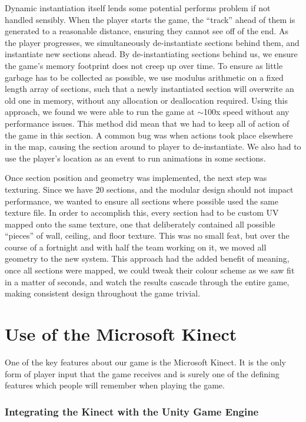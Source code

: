 \documentclass[a4paper,oneside]{memoir}
\begin{document}
			Dynamic instantiation itself lends some potential performs problem if not handled sensibly. 
			When the player starts the game, the ``track'' ahead of them is generated to a reasonable distance, ensuring they cannot see off of the end.
			As the player progresses, we simultaneously de-instantiate sections behind them, and instantiate new sections ahead. By de-instantiating sections behind us, we ensure the game's memory footprint does not creep up over time. 
			To ensure as little garbage has to be collected as possible, we use modulus arithmetic on a fixed length array of sections, such that a newly instantiated section will overwrite an old one in memory, without any allocation or deallocation required.
			Using this approach, we found we were able to run the game at $\sim$100x speed without any performance issues.
			This method did mean that we had to keep all of action of the game in this section. A common bug was when actions took place elsewhere in the map, causing the section around to player to de-instantiate. 
			We also had to use the player's location as an event to run animations in some sections. 

			Once section position and geometry was implemented, the next step was texturing.
			Since we have 20 sections, and the modular design should not impact performance, we wanted to ensure all sections where possible used the same texture file.
			In order to accomplish this, every section had to be custom UV mapped onto the same texture, one that deliberately contained all possible ``pieces'' of wall, ceiling, and floor texture.
			This was no small feat, but over the course of a fortnight and with half the team working on it, we moved all geometry to the new system.
			This approach had the added benefit of meaning, once all sections were mapped, we could tweak their colour scheme as we saw fit in a matter of seconds, and watch the results cascade through the entire game, making consistent design throughout the game trivial.

		\section{Use of the Microsoft Kinect}

			One of the key features about our game is the Microsoft Kinect.
			It is the only form of player input that the game receives and is surely one of the defining features which people will remember when playing the game.

			\subsubsection{Integrating the Kinect with the Unity Game Engine}
\end{document}
